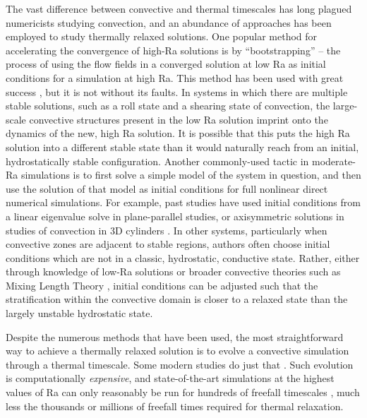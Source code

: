 \documentclass[aps, pre, onecolumn, nofootinbib, notitlepage, groupedaddress, amsfonts, amssymb, amsmath, longbibliography]{revtex4-1}
\begin{document}
The vast difference between convective and thermal timescales has long plagued
numericists studying convection, and an abundance of approaches has been employed to
study thermally relaxed solutions. One popular method for accelerating the convergence
of high-Ra solutions is by ``bootstrapping'' -- the process of using the flow
fields in a converged solution at low Ra as initial conditions for a simulation at high
Ra.  This method has been used with great success \cite{johnston&doering2009, verzicco&camussi1997},
but it is not without its faults.  In systems in which there are multiple
stable solutions, such as a roll state and a shearing state of convection,
the large-scale convective structures present in the
low Ra solution imprint onto the dynamics of the new, high Ra solution. 
It is possible that this puts the high Ra solution into a different stable state
than it would naturally reach from an initial, hydrostatically stable configuration.
Another commonly-used tactic in
moderate-Ra simulations is to first solve a simple model of the system in question,
and then use the solution of that model as initial conditions for full nonlinear
direct numerical simulations. For example, past studies have used initial conditions from
a linear eigenvalue solve \cite{hurlburt&all1984} in plane-parallel studies, or
axisymmetric solutions in studies of convection in 3D cylinders \cite{verzicco&camussi1997}. 
In other systems, particularly when convective zones are adjacent to stable regions,
authors often choose initial conditions which are not in a classic, hydrostatic,
conductive state. Rather, either through knowledge of low-Ra solutions \cite{couston&all2017}
or broader convective theories such as Mixing Length Theory
\cite{brandenburg&all2005}, initial conditions can be adjusted such that the stratification
within the convective domain is closer to a relaxed state than the largely
unstable hydrostatic state.

Despite the numerous methods that have been used,
the most straightforward way to achieve a thermally relaxed solution
is to evolve a convective simulation through a thermal timescale. Some modern
studies do just that \cite{featherstone&hindman2016}.
Such evolution is computationally 
\emph{expensive}, and state-of-the-art simulations at the highest values of Ra
can only reasonably be run
for hundreds of freefall timescales \cite{stevens&all2011}, much less the
thousands or millions of freefall times required for thermal relaxation.
\end{document}
